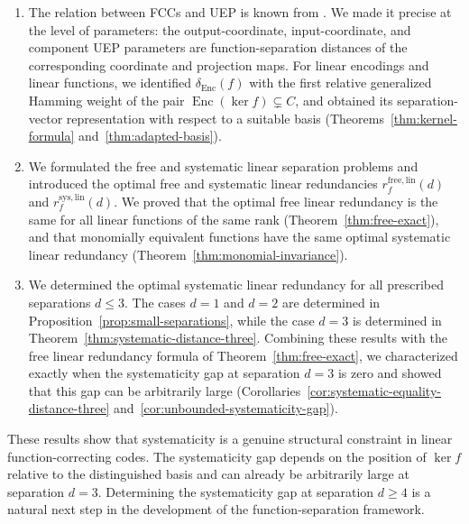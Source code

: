\documentclass[a4paper,12pt]{article}
\theoremstyle{plain}
\theoremstyle{definition}
\newcommand{\Enc}{\operatorname{Enc}}
\begin{document}
\begin{enumerate}

\item The relation between FCCs and UEP is known from
\cite{lenz2023}. We made it precise at the level of parameters: the
output-coordinate, input-coordinate, and component UEP parameters are
function-separation distances of the corresponding coordinate and
projection maps.
For linear encodings and
linear functions, we identified $\delta_{\Enc}(f)$ with the first relative
generalized Hamming weight of the pair
$\Enc(\ker f)\subsetneq C$, and obtained its separation-vector
representation with respect to a suitable basis
(Theorems~\ref{thm:kernel-formula} and~\ref{thm:adapted-basis}).

\item We formulated the free and systematic linear separation problems and introduced the optimal
free and systematic linear redundancies
$r_f^{\mathrm{free,lin}}(d)$ and
$r_f^{\mathrm{sys,lin}}(d)$. We proved that the optimal free linear
redundancy is the same for all linear functions of the same rank
(Theorem~\ref{thm:free-exact}), and that monomially equivalent functions
have the same optimal systematic linear redundancy
(Theorem~\ref{thm:monomial-invariance}).

\item We determined the optimal systematic linear redundancy for all
prescribed separations $d\leq3$. The cases $d=1$ and $d=2$ are
determined in Proposition~\ref{prop:small-separations}, while the
case $d=3$ is determined in
Theorem~\ref{thm:systematic-distance-three}. Combining these results
with the free linear redundancy formula of
Theorem~\ref{thm:free-exact}, we characterized exactly when the
systematicity gap at separation $d=3$ is zero and showed that this
gap can be arbitrarily large
(Corollaries~\ref{cor:systematic-equality-distance-three}
and~\ref{cor:unbounded-systematicity-gap}).

\end{enumerate}

These results show that systematicity is a genuine
structural constraint in linear function-correcting codes. 
The systematicity gap depends on the position of $\ker f$ relative to the distinguished basis  and can already be arbitrarily large at separation $d=3$. 
Determining the systematicity gap at separation $d \ge 4$ is a natural next step in the development of the function-separation framework.
 
\end{document}
